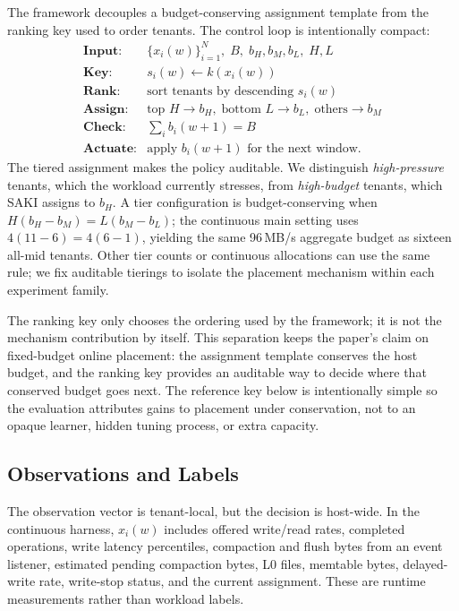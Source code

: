 The framework decouples a budget-conserving assignment template from the
ranking key used to order tenants. The control loop is intentionally compact:
\[
\begin{array}{ll}
\textbf{Input:} & \{x_i(w)\}_{i=1}^{N},\; B,\; b_H,b_M,b_L,\; H,L \\
\textbf{Key:} & s_i(w) \leftarrow k(x_i(w)) \\
\textbf{Rank:} & \text{sort tenants by descending } s_i(w) \\
\textbf{Assign:} & \text{top }H\rightarrow b_H,\; \text{bottom }L\rightarrow b_L,\;
\text{others}\rightarrow b_M \\
\textbf{Check:} & \sum_i b_i(w+1)=B \\
\textbf{Actuate:} & \text{apply } b_i(w+1) \text{ for the next window.}
\end{array}
\]
The tiered assignment makes the policy auditable. We distinguish
\emph{high-pressure} tenants, which the workload currently stresses, from
\emph{high-budget} tenants, which SAKI assigns to \(b_H\). A tier configuration
is budget-conserving when \(H(b_H-b_M)=L(b_M-b_L)\); the continuous main
setting uses \(4(11-6)=4(6-1)\), yielding the same 96\,MB/s aggregate budget as
sixteen all-mid tenants. Other tier counts or continuous allocations can use
the same rule; we fix auditable tierings to isolate the placement mechanism
within each experiment family.

The ranking key only chooses the ordering used by the framework; it is not
the mechanism contribution by itself. This separation keeps the paper's claim
on fixed-budget online placement: the assignment template conserves the host
budget, and the ranking key provides an auditable way to decide where that
conserved budget goes next. The reference key below is intentionally simple so
the evaluation attributes gains to placement under conservation, not to an
opaque learner, hidden tuning process, or extra capacity.

\subsection{Observations and Labels}

The observation vector is tenant-local, but the decision is host-wide. In the
continuous harness, \(x_i(w)\) includes offered write/read rates, completed
operations, write latency percentiles, compaction and flush bytes from an event
listener, estimated pending compaction bytes, L0 files, memtable bytes,
delayed-write rate, write-stop status, and the current assignment. These are
runtime measurements rather than workload labels.

